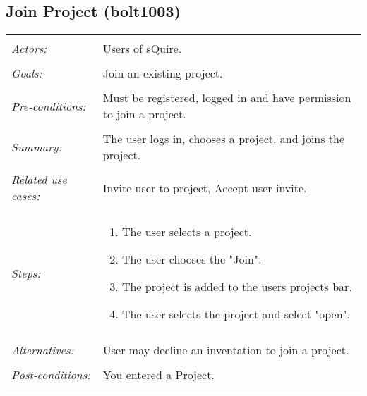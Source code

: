 \documentclass[11pt]{report}
\begin{document}
\subsection{Join Project (bolt1003)}
\begin{tabular}{ p{2cm} p{12cm} }
\hline
\\
\textit{Actors:} & Users of sQuire. \\ 
\\
\textit{Goals:} & Join an existing project.\\
\\
\textit{Pre-conditions:} & Must be registered, logged in and have permission to join a project.\\
\\
\textit{Summary:} & The user logs in, chooses a project, and joins the project. \\
\\
\textit{Related use cases:} & Invite user to project, Accept user invite. \\
\\
\textit{Steps:} & \begin{enumerate}
 \item The user selects a project.
 \item The user chooses the "Join". 
 \item The project is added to the users projects bar.
 \item The user selects the project and select "open".
\end{enumerate}\\
\\
\textit{Alternatives:} & User may decline an inventation to join a project. \\
\\
\textit{Post-conditions:} & You entered a Project. \\
\\
\hline
\end{tabular}
\end{document}
